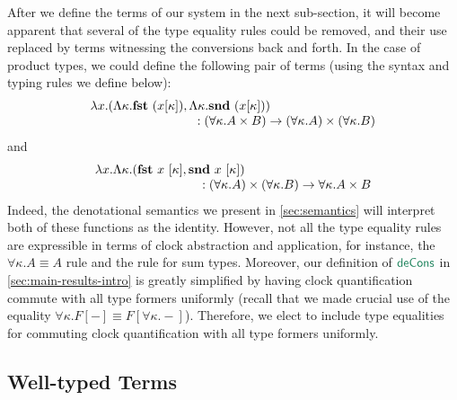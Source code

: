 After we define the terms of our system in the next sub-section, it
will become apparent that several of the type equality rules could be
removed, and their use replaced by terms witnessing the conversions
back and forth. In the case of product types, we could define the
following pair of terms (using the syntax and typing rules we define
below):
\begin{displaymath}
  \begin{array}{l}
    \lambda x. (\Lambda \kappa. \mathbf{fst}~(x[\kappa]), \Lambda \kappa. \kw{snd}~(x[\kappa])) \\
    \hspace{3cm} : (\forall \kappa. A \times B) \to (\forall \kappa. A) \times (\forall \kappa. B)
  \end{array}
\end{displaymath}
and
\begin{displaymath}
  \begin{array}{l}
    \lambda x. \Lambda \kappa. (\kw{fst}~x~[\kappa], \kw{snd}~x~[\kappa]) \\
    \hspace{3cm} : (\forall \kappa. A) \times (\forall \kappa. B) \to \forall \kappa. A \times B
  \end{array}
\end{displaymath}
Indeed, the denotational semantics we present in
\autoref{sec:semantics} will interpret both of these functions as the
identity. However, not all the type equality rules are expressible in
terms of clock abstraction and application, for instance, the $\forall
\kappa. A \equiv A$ rule and the rule for sum types. Moreover, our
definition of $\elim{deCons}$ in \autoref{sec:main-results-intro} is
greatly simplified by having clock quantification commute with all
type formers uniformly (recall that we made crucial use of the
equality $\forall \kappa. F[-] \equiv F[\forall
\kappa. -]$). Therefore, we elect to include type equalities for
commuting clock quantification with all type formers uniformly.

\subsection{Well-typed Terms}
\label{sec:typed-terms}

